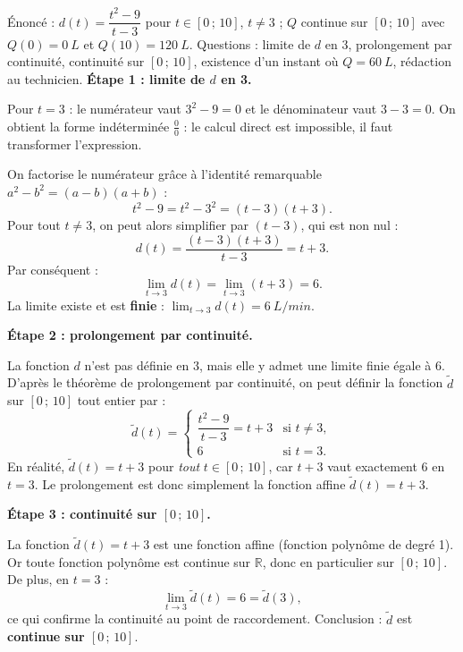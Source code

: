 \documentclass[11pt]{article}
\newcommand{\cle}[1]{{\popxbold\color{popdark}#1}}
\begin{document}
\begin{exoresolu}
Énoncé : $d(t) = \dfrac{t^2 - 9}{t - 3}$ pour $t \in [0\,;\,10]$, $t \neq 3$ ; $Q$ continue sur $[0\,;\,10]$ avec $Q(0) = \SI{0}{L}$ et $Q(10) = \SI{120}{L}$. Questions : limite de $d$ en 3, prolongement par continuité, continuité sur $[0\,;\,10]$, existence d'un instant où $Q = \SI{60}{L}$, rédaction au technicien.
\tcblower
\textbf{Étape 1 : limite de $d$ en 3.}

Pour $t = 3$ : le numérateur vaut $3^2 - 9 = 0$ et le dénominateur vaut $3 - 3 = 0$. On obtient la forme indéterminée $\frac{0}{0}$ : le calcul direct est impossible, il faut transformer l'expression.

On factorise le numérateur grâce à l'identité remarquable $a^2 - b^2 = (a-b)(a+b)$ :
\[ t^2 - 9 = t^2 - 3^2 = (t - 3)(t + 3). \]
Pour tout $t \neq 3$, on peut alors simplifier par $(t-3)$, qui est non nul :
\[ d(t) = \frac{(t-3)(t+3)}{t-3} = t + 3. \]
Par conséquent :
\[ \lim_{t \to 3} d(t) = \lim_{t \to 3} (t + 3) = 6. \]
La limite existe et est \textbf{finie} : $\displaystyle\lim_{t \to 3} d(t) = \SI{6}{L/min}$.

\textbf{Étape 2 : prolongement par continuité.}

La fonction $d$ n'est pas définie en $3$, mais elle y admet une limite finie égale à $6$. D'après le théorème de prolongement par continuité, on peut définir la fonction $\tilde{d}$ sur $[0\,;\,10]$ tout entier par :
\[ \tilde{d}(t) = \begin{cases} \dfrac{t^2 - 9}{t - 3} = t + 3 & \text{si } t \neq 3, \\ 6 & \text{si } t = 3. \end{cases} \]
En réalité, $\tilde{d}(t) = t + 3$ pour \emph{tout} $t \in [0\,;\,10]$, car $t+3$ vaut exactement $6$ en $t = 3$. Le prolongement est donc simplement la fonction affine $\tilde{d}(t) = t + 3$.

\textbf{Étape 3 : continuité sur $[0\,;\,10]$.}

La fonction $\tilde{d}(t) = t + 3$ est une fonction \cle{affine} (fonction polynôme de degré 1). Or toute fonction polynôme est continue sur $\mathbb{R}$, donc en particulier sur $[0\,;\,10]$. De plus, en $t = 3$ :
\[ \lim_{t \to 3} \tilde{d}(t) = 6 = \tilde{d}(3), \]
ce qui confirme la continuité au point de raccordement. Conclusion : $\tilde{d}$ est \textbf{continue sur $[0\,;\,10]$}.


\end{exoresolu}
\end{document}
